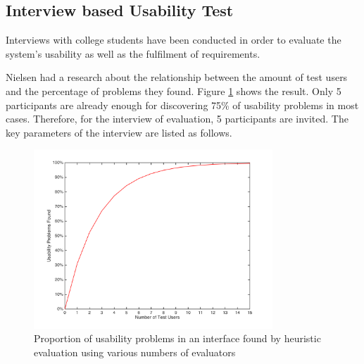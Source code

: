 


\subsection{Interview based Usability Test}

Interviews with college students have been conducted in order to evaluate the system's usability as well as the fulfilment of requirements. 

Nielsen had a research about the relationship between the amount of test users and the percentage of problems they found. Figure \ref{fig:eval-nielsen} shows the result\cite{nielsen2001conduct}. Only 5 participants are already enough for discovering 75\% of usability problems in most cases. Therefore, for the interview of evaluation, 5 participants are invited. The key parameters of the interview are listed as follows. 

\begin{figure}[!htbp]
  \centering
    \includegraphics[width=0.8\textwidth]{Figures/eval-nielsen.png}
  \caption{Proportion of usability problems in an interface found by heuristic evaluation using various numbers of evaluators}
  \label{fig:eval-nielsen}
\end{figure}

